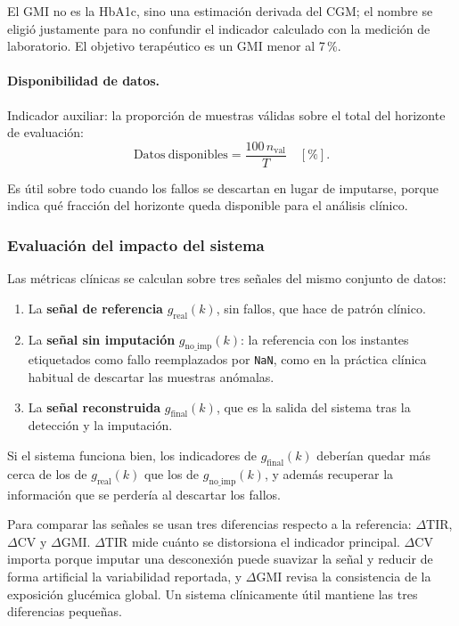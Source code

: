 \documentclass{report}
\begin{document}
El GMI no es la HbA1c, sino una estimación derivada del CGM; el nombre se eligió justamente para no confundir el indicador calculado con la medición de laboratorio. El objetivo terapéutico es un GMI menor al 7\,\%.

\paragraph{Disponibilidad de datos.} Indicador auxiliar: la proporción de muestras válidas sobre el total del horizonte de evaluación:
\begin{equation}
\label{eq:data_avail}
\mathrm{Datos\ disponibles} = \frac{100\, n_{\mathrm{val}}}{T} \quad [\%].
\end{equation}

Es útil sobre todo cuando los fallos se descartan en lugar de imputarse, porque indica qué fracción del horizonte queda disponible para el análisis clínico.

\subsubsection{Evaluación del impacto del sistema}
\label{subsec:impacto_clinico}

Las métricas clínicas se calculan sobre tres señales del mismo conjunto de datos:

\begin{enumerate}
    \item La \textbf{señal de referencia} $g_{\mathrm{real}}(k)$, sin fallos, que hace de patrón clínico.
    \item La \textbf{señal sin imputación} $g_{\mathrm{no\_imp}}(k)$: la referencia con los instantes etiquetados como fallo reemplazados por \texttt{NaN}, como en la práctica clínica habitual de descartar las muestras anómalas.
    \item La \textbf{señal reconstruida} $g_{\mathrm{final}}(k)$, que es la salida del sistema tras la detección y la imputación.
\end{enumerate}

Si el sistema funciona bien, los indicadores de $g_{\mathrm{final}}(k)$ deberían quedar más cerca de los de $g_{\mathrm{real}}(k)$ que los de $g_{\mathrm{no\_imp}}(k)$, y además recuperar la información que se perdería al descartar los fallos.

Para comparar las señales se usan tres diferencias respecto a la referencia: $\Delta\mathrm{TIR}$, $\Delta\mathrm{CV}$ y $\Delta\mathrm{GMI}$. $\Delta\mathrm{TIR}$ mide cuánto se distorsiona el indicador principal. $\Delta\mathrm{CV}$ importa porque imputar una desconexión puede suavizar la señal y reducir de forma artificial la variabilidad reportada, y $\Delta\mathrm{GMI}$ revisa la consistencia de la exposición glucémica global. Un sistema clínicamente útil mantiene las tres diferencias pequeñas.
\end{document}
